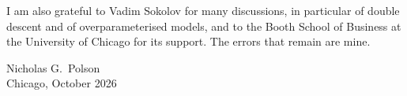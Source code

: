 I am also grateful to Vadim Sokolov for many discussions, in particular of double descent and of
overparameterised models, and to the Booth School of Business at the University of Chicago for
its support. The errors that remain are mine.

\vspace{1em}
\noindent Nicholas G.\ Polson\\
Chicago, October 2026
